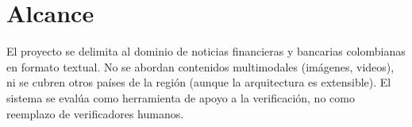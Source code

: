 \section{Alcance}

El proyecto se delimita al dominio de noticias financieras y bancarias colombianas en formato textual. No se abordan contenidos multimodales (imágenes, videos), ni se cubren otros países de la región (aunque la arquitectura es extensible). El sistema se evalúa como herramienta de apoyo a la verificación, no como reemplazo de verificadores humanos.
